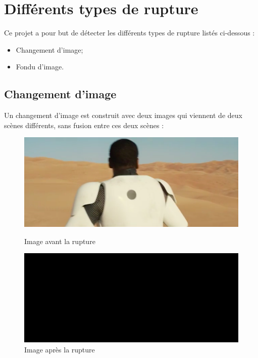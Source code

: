 \section{Différents types de rupture}

Ce projet a pour but de détecter les différents types de rupture listés ci-dessous :

\begin{itemize}
	\item Changement d'image;
	\item Fondu d'image.
\end{itemize}

\subsection{Changement d’image}
Un changement d'image est construit avec deux images qui viennent de deux scènes différents, sans fusion entre ces deux scènes :

\begin{figure}[h!]
   \begin{minipage}[c]{.46\linewidth}
	  \centering
      \includegraphics[scale=0.3]{images/rupture1-1.png}
      \caption{\label{Avant} Image avant la rupture}
   \end{minipage} \hfill
   \begin{minipage}[c]{.46\linewidth}
      \centering
      \includegraphics[scale=0.3]{images/rupture1-2.png}
      \caption{\label{Après} Image après la rupture}
   \end{minipage}
\end{figure}


